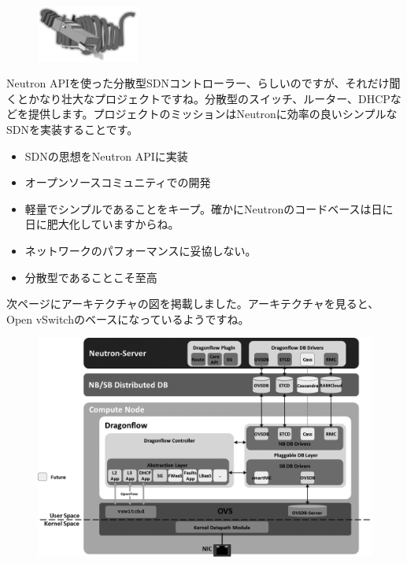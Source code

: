 \begin{figure}
	\vspace*{-2\intextsep}
	\begin{center}
		\includegraphics[width=0.3\textwidth]{img/Df_logo.png}
	\end{center}
\end{figure}

Neutron APIを使った分散型SDNコントローラー、らしいのですが、それだけ聞くとかなり壮大なプロジェクトですね。分散型のスイッチ、ルーター、DHCPなどを提供します。プロジェクトのミッションはNeutronに効率の良いシンプルなSDNを実装することです。

\begin{itemize}
	\item SDNの思想をNeutron APIに実装
	\item オープンソースコミュニティでの開発
	\item 軽量でシンプルであることをキープ。確かにNeutronのコードベースは日に日に肥大化していますからね。
	\item ネットワークのパフォーマンスに妥協しない。
	\item 分散型であることこそ至高
\end{itemize}

次ページにアーキテクチャの図を掲載しました。アーキテクチャを見ると、Open vSwitchのベースになっているようですね。

\begin{figure}[htb]
	\begin{center}
		\includegraphics[width=\textwidth]{img/dragonflow_distributed_architecture.png}
	\end{center}
\end{figure}

